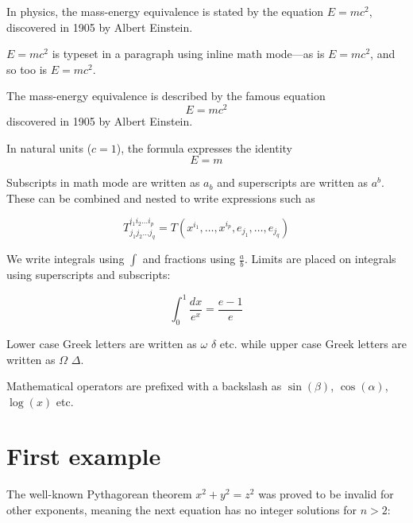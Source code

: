 \documentclass{article}
\begin{document}
In physics, the mass-energy equivalence is stated 
by the equation $E=mc^2$, discovered in 1905 by Albert Einstein.

\begin{math}
    E=mc^2
\end{math} is typeset in a paragraph using inline math mode---as is $E=mc^2$, and so too is \(E=mc^2\).

The mass-energy equivalence is described by the famous equation
\[ E=mc^2 \] discovered in 1905 by Albert Einstein. 

In natural units ($c = 1$), the formula expresses the identity
\begin{equation}
E=m
\end{equation}

Subscripts in math mode are written as $a_b$ and superscripts are written as $a^b$.
These can be combined and nested to write expressions such as

\[ T^{i_1 i_2 \dots i_p}_{j_1 j_2 \dots j_q} = T(x^{i_1},\dots,x^{i_p},e_{j_1},\dots,e_{j_q}) \]

We write integrals using $\int$ and fractions using $\frac{a}{b}$.
Limits are placed on integrals using superscripts and subscripts:

\[ \int_0^1 \frac{dx}{e^x} =  \frac{e-1}{e} \]

Lower case Greek letters are written as $\omega$ $\delta$ etc.
while upper case Greek letters are written as $\Omega$ $\Delta$.

Mathematical operators are prefixed with a backslash as $\sin(\beta)$, $\cos(\alpha)$, $\log(x)$ etc.

\section{First example}

The well-known Pythagorean theorem \(x^2 + y^2 = z^2\) was proved to be invalid for other exponents, 
meaning the next equation has no integer solutions for \(n>2\):
\end{document}

